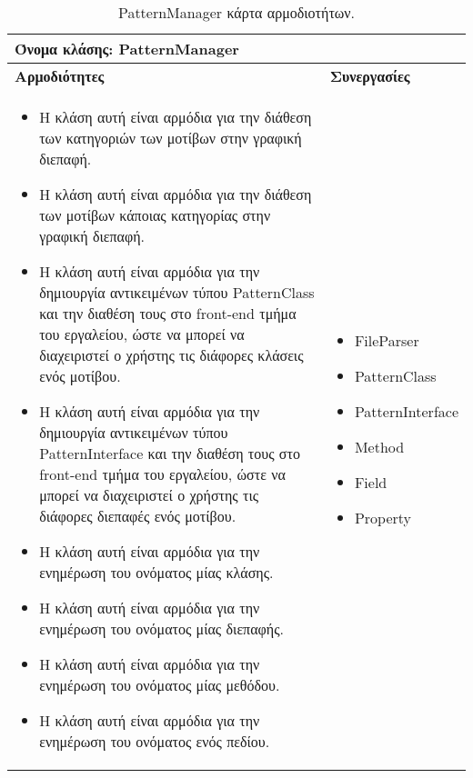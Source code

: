 \begin{table}[H]
    \centering
    \begin{tabular}{|p{10cm}|p{5cm}|}
        \hline
        \multicolumn{2}{|l|}{Όνομα κλάσης: PatternManager} \\
        \hline
        \textbf{Αρμοδιότητες} & \textbf{Συνεργασίες} \\
        \hline
        \begin{itemize}
            \item Η κλάση αυτή είναι αρμόδια για την διάθεση των κατηγοριών των μοτίβων στην γραφική διεπαφή.
            \item Η κλάση αυτή είναι αρμόδια για την διάθεση των μοτίβων κάποιας κατηγορίας στην γραφική διεπαφή.
            \item Η κλάση αυτή είναι αρμόδια για την δημιουργία αντικειμένων τύπου PatternClass και την διαθέση τους στο front-end τμήμα του 
            εργαλείου, ώστε να μπορεί να διαχειριστεί ο χρήστης τις διάφορες κλάσεις ενός μοτίβου.
            \item Η κλάση αυτή είναι αρμόδια για την δημιουργία αντικειμένων τύπου PatternInterface και την διαθέση τους στο front-end τμήμα του 
            εργαλείου, ώστε να μπορεί να διαχειριστεί ο χρήστης τις διάφορες διεπαφές ενός μοτίβου.
            \item Η κλάση αυτή είναι αρμόδια για την ενημέρωση του ονόματος μίας κλάσης.
            \item Η κλάση αυτή είναι αρμόδια για την ενημέρωση του ονόματος μίας διεπαφής.
            \item Η κλάση αυτή είναι αρμόδια για την ενημέρωση του ονόματος μίας μεθόδου.
            \item Η κλάση αυτή είναι αρμόδια για την ενημέρωση του ονόματος ενός πεδίου.
        \end{itemize} &   
        \begin{itemize}
            \item FileParser
            \item PatternClass
            \item PatternInterface
            \item Method
            \item Field
            \item Property
        \end{itemize} \\
        \hline
    \end{tabular}
    \caption{PatternManager κάρτα αρμοδιοτήτων.}
    \label{tab:PatternManagerCRC}
\end{table}
